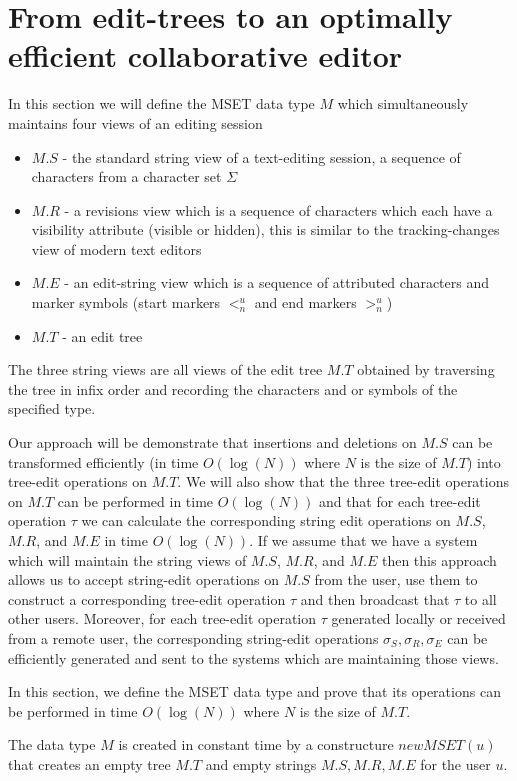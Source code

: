 \documentclass{amsart}
\begin{document}
\section{From edit-trees to an optimally efficient collaborative editor}
In this section we will define the MSET data type $M$ which simultaneously maintains
four views of an editing session
\begin{itemize}
\item $M.S$ - the standard string view of a text-editing session, a sequence of characters from a character set $\Sigma$
\item $M.R$ - a revisions view which is a sequence of characters which each have a visibility attribute (visible or hidden), this is similar to the tracking-changes view of modern text editors
\item $M.E$ - an edit-string view which is a sequence of attributed characters and marker symbols (start markers $<^u_n$ and end markers $>^u_n$)
\item $M.T$ - an edit tree
\end{itemize}
The three string views are all views of the edit tree $M.T$ obtained by traversing the tree in infix order and recording the characters and or symbols of the specified type.

Our approach will be demonstrate that insertions and deletions on $M.S$ can be
transformed efficiently (in time $O(\log(N))$ where $N$ is the size of $M.T$) into
tree-edit operations on $M.T$.  We will also show that the three tree-edit operations
on $M.T$ can be performed in time $O(\log(N))$ and that for each tree-edit operation $\tau$ we can calculate the corresponding string edit operations on $M.S$, $M.R$, and $M.E$ in time $O(\log(N))$.  If we assume that we have a system which will maintain the string views of $M.S$, $M.R$, and $M.E$ then this approach allows us to accept string-edit operations on $M.S$ from the user, use them to construct a corresponding tree-edit operation $\tau$ and then broadcast that $\tau$ to all other users.  Moreover, for each tree-edit operation $\tau$ generated locally or received from a remote user, the corresponding string-edit operations $\sigma_S, \sigma_R, \sigma_E$ can be efficiently generated and sent to the systems which are maintaining those views.

In this section, we define the MSET data type and prove that its operations can be performed in time $O(\log(N))$ where $N$ is the size of $M.T$.

The data type $M$ is created in constant time by a constructure $newMSET(u)$ that creates an empty tree $M.T$ and empty strings $M.S, M.R, M.E$ for the user $u$.
\end{document}
